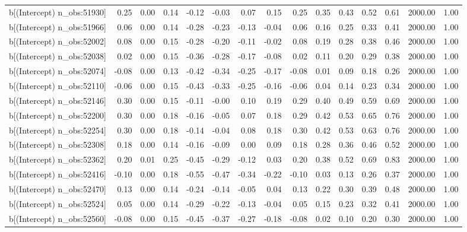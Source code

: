 \begin{table}[ht]
\begin{tabular}{rrrrrrrrrrrrrrr}
  b[(Intercept) n\_obs:51930] & 0.25 & 0.00 & 0.14 & -0.12 & -0.03 & 0.07 & 0.15 & 0.25 & 0.35 & 0.43 & 0.52 & 0.61 & 2000.00 & 1.00 \\ 
  b[(Intercept) n\_obs:51966] & 0.06 & 0.00 & 0.14 & -0.28 & -0.23 & -0.13 & -0.04 & 0.06 & 0.16 & 0.25 & 0.33 & 0.41 & 2000.00 & 1.00 \\ 
  b[(Intercept) n\_obs:52002] & 0.08 & 0.00 & 0.15 & -0.28 & -0.20 & -0.11 & -0.02 & 0.08 & 0.19 & 0.28 & 0.38 & 0.46 & 2000.00 & 1.00 \\ 
  b[(Intercept) n\_obs:52038] & 0.02 & 0.00 & 0.15 & -0.36 & -0.28 & -0.17 & -0.08 & 0.02 & 0.11 & 0.20 & 0.29 & 0.38 & 2000.00 & 1.00 \\ 
  b[(Intercept) n\_obs:52074] & -0.08 & 0.00 & 0.13 & -0.42 & -0.34 & -0.25 & -0.17 & -0.08 & 0.01 & 0.09 & 0.18 & 0.26 & 2000.00 & 1.00 \\ 
  b[(Intercept) n\_obs:52110] & -0.06 & 0.00 & 0.15 & -0.43 & -0.33 & -0.25 & -0.16 & -0.06 & 0.04 & 0.14 & 0.23 & 0.34 & 2000.00 & 1.00 \\ 
  b[(Intercept) n\_obs:52146] & 0.30 & 0.00 & 0.15 & -0.11 & -0.00 & 0.10 & 0.19 & 0.29 & 0.40 & 0.49 & 0.59 & 0.69 & 2000.00 & 1.00 \\ 
  b[(Intercept) n\_obs:52200] & 0.30 & 0.00 & 0.18 & -0.16 & -0.05 & 0.07 & 0.18 & 0.29 & 0.42 & 0.53 & 0.65 & 0.76 & 2000.00 & 1.00 \\ 
  b[(Intercept) n\_obs:52254] & 0.30 & 0.00 & 0.18 & -0.14 & -0.04 & 0.08 & 0.18 & 0.30 & 0.42 & 0.53 & 0.63 & 0.76 & 2000.00 & 1.00 \\ 
  b[(Intercept) n\_obs:52308] & 0.18 & 0.00 & 0.14 & -0.16 & -0.09 & 0.00 & 0.09 & 0.18 & 0.28 & 0.36 & 0.46 & 0.52 & 2000.00 & 1.00 \\ 
  b[(Intercept) n\_obs:52362] & 0.20 & 0.01 & 0.25 & -0.45 & -0.29 & -0.12 & 0.03 & 0.20 & 0.38 & 0.52 & 0.69 & 0.83 & 2000.00 & 1.00 \\ 
  b[(Intercept) n\_obs:52416] & -0.10 & 0.00 & 0.18 & -0.55 & -0.47 & -0.34 & -0.22 & -0.10 & 0.03 & 0.13 & 0.26 & 0.37 & 2000.00 & 1.00 \\ 
  b[(Intercept) n\_obs:52470] & 0.13 & 0.00 & 0.14 & -0.24 & -0.14 & -0.05 & 0.04 & 0.13 & 0.22 & 0.30 & 0.39 & 0.48 & 2000.00 & 1.00 \\ 
  b[(Intercept) n\_obs:52524] & 0.05 & 0.00 & 0.14 & -0.29 & -0.22 & -0.13 & -0.04 & 0.05 & 0.15 & 0.23 & 0.32 & 0.41 & 2000.00 & 1.00 \\ 
  b[(Intercept) n\_obs:52560] & -0.08 & 0.00 & 0.15 & -0.45 & -0.37 & -0.27 & -0.18 & -0.08 & 0.02 & 0.10 & 0.20 & 0.30 & 2000.00 & 1.00 \\ 

\end{tabular}
\end{table}
